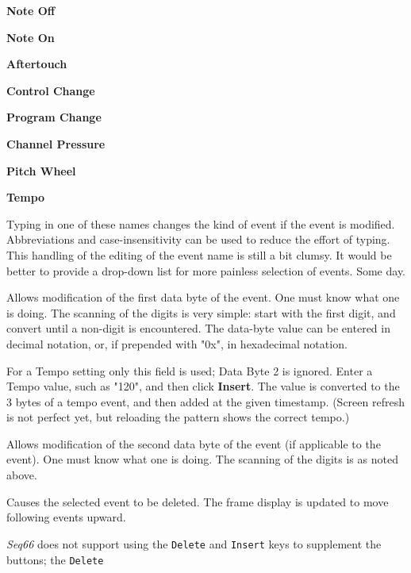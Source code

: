    \begin{enumber}
      \item \textbf{Note Off}
      \item \textbf{Note On}
      \item \textbf{Aftertouch}
      \item \textbf{Control Change}
      \item \textbf{Program Change}
      \item \textbf{Channel Pressure}
      \item \textbf{Pitch Wheel}
      \item \textbf{Tempo}
   \end{enumber}

   Typing in one of these names changes the kind of event if the event is
   modified.  Abbreviations and case-insensitivity can be used to reduce the
   effort of typing.
   This handling of the editing of the event name is still a bit clumsy.
   It would be better to provide a drop-down list for more painless
   selection of events.  Some day.

   Allows modification of the first data byte of the event.
   One must know what one is doing.
   The scanning of the digits is very simple:  start with the first digit, and
   convert until a non-digit is encountered.  The data-byte value can be
   entered in decimal notation, or, if prepended with "0x", in hexadecimal
   notation.

   For a Tempo setting only this field is used; Data Byte 2 is ignored.
   Enter a Tempo value, such as "120", and then click \textbf{Insert}. The
   value is converted to the 3 bytes of a tempo event, and then
   added at the given timestamp.  (Screen refresh is not perfect yet, but
   reloading the pattern shows the correct tempo.)

   Allows modification of the second data byte of the event (if applicable
   to the event).
   One must know what one is doing.
   The scanning of the digits is as noted above.

   Causes the selected event to be deleted.
   The frame display is updated to move following events upward.

   \textsl{Seq66} does not support using the
   \texttt{Delete} and \texttt{Insert} keys to
   supplement the buttons; the \texttt{Delete}

